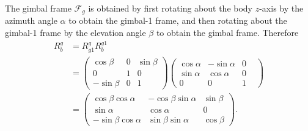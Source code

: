 The gimbal frame $\mathcal{F}_g$ is obtained by first rotating about the body $z$-axis by the azimuth angle $\alpha$ to obtain the gimbal-1 frame, and then rotating about the gimbal-1 frame by the elevation angle $\beta$ to obtain the gimbal frame. Therefore
\begin{align*}
R_b^g &= R_{g1}^g R_b^{g1} \\
	  &= \begin{pmatrix} \cos\beta & 0 & \sin\beta \\ 0 & 1 & 0 \\ -\sin\beta & 0 & 1 \end{pmatrix} \begin{pmatrix} \cos\alpha & -\sin\alpha & 0 & \\ \sin\alpha & \cos\alpha & 0 \\ 0 & 0 & 1 \end{pmatrix} \\
	  &= \begin{pmatrix}
	  \cos\beta\cos\alpha & -\cos\beta\sin\alpha & \sin\beta \\
	  \sin\alpha & \cos\alpha & 0 \\
	  -\sin\beta\cos\alpha & \sin\beta\sin\alpha & \cos\beta
	  \end{pmatrix}.
\end{align*}

